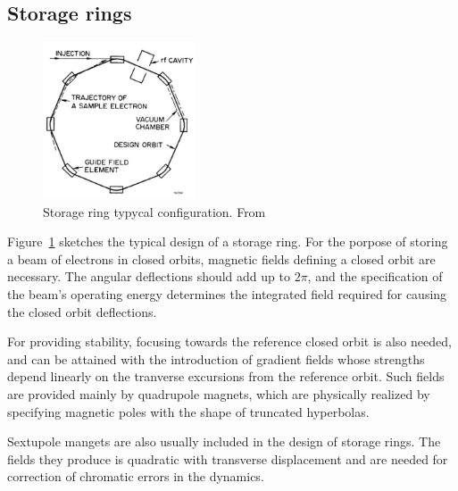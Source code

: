 \subsection{Storage rings}
\begin{figure}[htb]
    \centering
    \includegraphics[width=0.4\textwidth]{Images/storage_ring.png}
    \caption{Storage ring typycal configuration. From \cite{sands}}
    \label{sr}
\end{figure}
Figure~\ref{sr} sketches the typical design of a storage ring. For the porpose of storing a beam of electrons in closed orbits, magnetic fields defining a closed orbit are necessary. The angular deflections should add up to $2\pi$, and the specification of the beam's operating energy determines the integrated field required for causing the closed orbit deflections.

For providing stability, focusing towards the reference closed orbit is also needed, and can be attained with the introduction of gradient fields whose strengths depend linearly on the tranverse excursions from the reference orbit. Such fields are provided mainly by quadrupole magnets, which are physically realized by specifying  magnetic poles with the shape of truncated hyperbolas.

Sextupole mangets are also usually included in the design of storage rings. The fields they produce is quadratic with transverse displacement and are needed for correction of chromatic errors in the dynamics.

